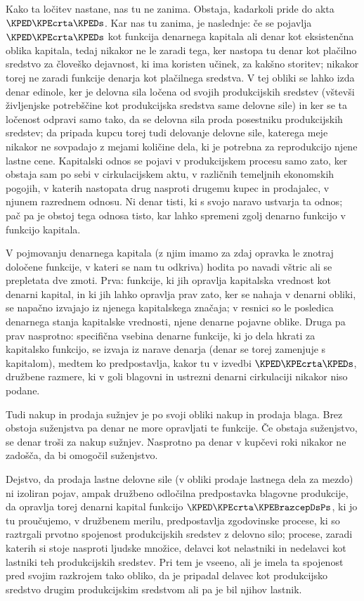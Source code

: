\documentclass[kapital_02.tex]{subfiles}
\begin{document}
Kako ta ločitev nastane, nas tu ne zanima. Obstaja, kadarkoli pride do akta \(\KPED\KPEcrta\KPEDs\). Kar nas tu zanima, je naslednje: če se pojavlja \(\KPED\KPEcrta\KPEDs\) kot funkcija denarnega kapitala ali denar kot eksistenčna oblika kapitala, tedaj nikakor \KPEstran ne le zaradi tega, ker nastopa tu denar kot plačilno sredstvo za človeško dejavnost, ki ima koristen učinek, za kakšno storitev; nikakor torej ne zaradi funkcije denarja kot plačilnega sredstva. V tej obliki se lahko izda denar edinole, ker je delovna sila ločena od svojih produkcijskih sredstev (vštevši življenjske potrebščine kot produkcijska sredstva same delovne sile) in ker se ta ločenost odpravi samo tako, da se delovna sila proda posestniku produkcijskih sredstev; da pripada kupcu torej tudi delovanje delovne sile, katerega meje nikakor ne sovpadajo z mejami količine dela, ki je potrebna za reprodukcijo njene lastne cene. Kapitalski odnos se pojavi v produkcijskem procesu samo zato, ker obstaja sam po sebi v cirkulacijskem aktu, v različnih temeljnih ekonomskih pogojih, v katerih nastopata drug nasproti drugemu kupec in prodajalec, v njunem razrednem odnosu. Ni denar tisti, ki s svojo naravo ustvarja ta odnos; pač pa je obstoj tega odnosa tisto, kar lahko spremeni zgolj denarno funkcijo v funkcijo kapitala.

V pojmovanju denarnega kapitala (z njim imamo za zdaj opravka le znotraj določene funkcije, v kateri se nam tu odkriva) hodita po navadi vštric ali se prepletata dve zmoti. Prva: funkcije, ki jih opravlja kapitalska vrednost kot denarni kapital, in ki jih lahko opravlja prav zato, ker se nahaja v denarni obliki, se napačno izvajajo iz njenega kapitalskega značaja; v resnici so le posledica denarnega stanja kapitalske vrednosti, njene denarne pojavne oblike. Druga pa prav nasprotno: specifična vsebina denarne funkcije, ki jo dela hkrati za kapitalsko funkcijo, se izvaja iz narave denarja (denar se torej zamenjuje s kapitalom), medtem ko predpostavlja, kakor tu v izvedbi \(\KPED\KPEcrta\KPEDs\), družbene razmere, ki v goli blagovni in ustrezni denarni cirkulaciji nikakor niso podane.

Tudi nakup in prodaja sužnjev je po svoji obliki nakup in prodaja blaga. Brez obstoja suženjstva pa denar ne more opravljati te funkcije. Če obstaja suženjstvo, se denar troši za nakup sužnjev. Nasprotno pa denar v kupčevi roki nikakor ne zadošča, da bi omogočil suženjstvo.

Dejstvo, da \KPEstran prodaja lastne delovne sile (v obliki prodaje lastnega dela za mezdo) ni izoliran pojav, ampak družbeno odločilna predpostavka blagovne produkcije, da opravlja torej denarni kapital funkcijo \(\KPED\KPEcrta\KPEBrazcepDsPs\), ki jo tu proučujemo, v družbenem merilu, predpostavlja zgodovinske procese, ki so raztrgali prvotno spojenost produkcijskih sredstev z delovno silo; procese, zaradi katerih si stoje nasproti ljudske množice, delavci kot nelastniki in nedelavci kot lastniki teh produkcijskih sredstev. Pri tem je vseeno, ali je imela ta spojenost pred svojim razkrojem tako obliko, da je pripadal delavec kot produkcijsko sredstvo drugim produkcijskim sredstvom ali pa je bil njihov lastnik.
\end{document}
